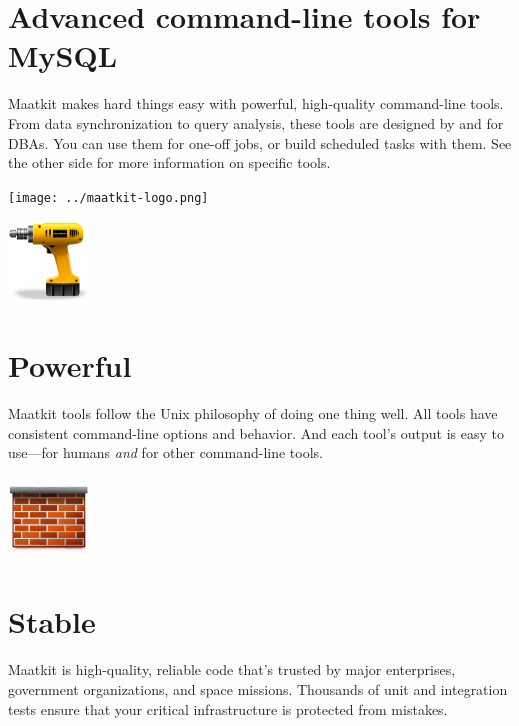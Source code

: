 \documentclass[letterpaper,twoside,12pt]{article}
\begin{document}
\begin{minipage}{0.8\textwidth}
\section*{Advanced command-line tools for MySQL\tiny\textregistered}
\normalsize

Maatkit makes hard things easy with powerful, high-quality command-line tools.
From data synchronization to query analysis, these tools are designed by and for
DBAs. You can use them for one-off jobs, or build scheduled tasks with them. See
the other side for more information on specific tools.
\end{minipage}
\hspace*{0.5cm}
\begin{minipage}{0.2\textwidth}
\texttt{[image: ../maatkit-logo.png]}
\end{minipage}


\begin{minipage}{0.2\textwidth}
\includegraphics[width=0.853in]{../image/package_utilities}
\end{minipage}
\begin{minipage}{0.8\textwidth}
\section*{Powerful}
Maatkit tools follow the Unix philosophy of doing one thing 
well.  All tools have consistent command-line options and
behavior.  And each tool's output is easy to use---for humans
\emph{and} for other command-line tools.
\end{minipage}
\vspace*{1cm}

\begin{minipage}{0.2\textwidth}
\includegraphics[width=0.853in]{../image/firewall}
\end{minipage}
\begin{minipage}{0.8\textwidth}
\section*{Stable}
Maatkit is high-quality, reliable code that's trusted by major enterprises,
government organizations, and space missions. Thousands of unit and
integration tests ensure that your critical infrastructure is protected from
mistakes.
\end{minipage}
\vspace*{1cm}
\end{document}
